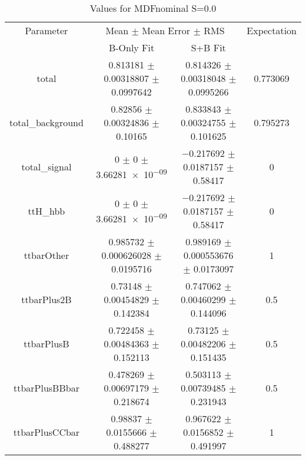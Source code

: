 \begin{table}
\centering
\caption{Values for MDFnominal S=0.0}
\begin{tabular}{cccc}
\toprule
Parameter & \multicolumn{2}{c}{Mean $\pm$ Mean Error $\pm$ RMS} & Expectation\\
 & B-Only Fit & S+B Fit & \\
\midrule
total & \num{0.813181} $\pm$ \num{0.00318807} $\pm$ \num{0.0997642} & \num{0.814326} $\pm$ \num{0.00318048} $\pm$ \num{0.0995266} & \num{0.773069}\\
total\_background & \num{0.82856} $\pm$ \num{0.00324836} $\pm$ \num{0.10165} & \num{0.833843} $\pm$ \num{0.00324755} $\pm$ \num{0.101625} & \num{0.795273}\\
total\_signal & \num{0} $\pm$ \num{0} $\pm$ \num{3.66281e-09} & \num{-0.217692} $\pm$ \num{0.0187157} $\pm$ \num{0.58417} & \num{0}\\
ttH\_hbb & \num{0} $\pm$ \num{0} $\pm$ \num{3.66281e-09} & \num{-0.217692} $\pm$ \num{0.0187157} $\pm$ \num{0.58417} & \num{0}\\
ttbarOther & \num{0.985732} $\pm$ \num{0.000626028} $\pm$ \num{0.0195716} & \num{0.989169} $\pm$ \num{0.000553676} $\pm$ \num{0.0173097} & \num{1}\\
ttbarPlus2B & \num{0.73148} $\pm$ \num{0.00454829} $\pm$ \num{0.142384} & \num{0.747062} $\pm$ \num{0.00460299} $\pm$ \num{0.144096} & \num{0.5}\\
ttbarPlusB & \num{0.722458} $\pm$ \num{0.00484363} $\pm$ \num{0.152113} & \num{0.73125} $\pm$ \num{0.00482206} $\pm$ \num{0.151435} & \num{0.5}\\
ttbarPlusBBbar & \num{0.478269} $\pm$ \num{0.00697179} $\pm$ \num{0.218674} & \num{0.503113} $\pm$ \num{0.00739485} $\pm$ \num{0.231943} & \num{0.5}\\
ttbarPlusCCbar & \num{0.98837} $\pm$ \num{0.0155666} $\pm$ \num{0.488277} & \num{0.967622} $\pm$ \num{0.0156852} $\pm$ \num{0.491997} & \num{1}\\
\bottomrule
\end{tabular}
\end{table}